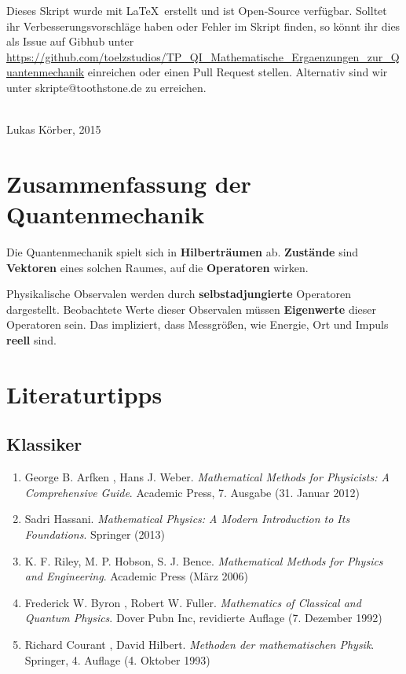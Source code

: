 \documentclass[a4paper,12pt,portrait]{book}
\numberwithin{equation}{section}
\begin{document}
Dieses Skript wurde mit \LaTeX \ erstellt und ist Open-Source verfügbar. Solltet ihr Verbesserungsvorschläge haben oder Fehler im Skript finden, so könnt ihr dies als Issue auf Gibhub unter   \url{https://github.com/toelzstudios/TP_QI_Mathematische_Ergaenzungen_zur_Quantenmechanik} einreichen oder einen Pull Request stellen. Alternativ sind wir unter skripte@toothstone.de zu erreichen.

\ \\
Lukas Körber, 2015
\endgroup






\tableofcontents

\newpage
\section{Zusammenfassung der Quantenmechanik}

Die Quantenmechanik spielt sich in \textbf{Hilberträumen} ab. \textbf{Zustände} sind \textbf{Vektoren} eines solchen Raumes, auf die \textbf{Operatoren} wirken.

Physikalische Observalen werden durch \textbf{selbstadjungierte} Operatoren dargestellt. Beobachtete Werte dieser Observalen müssen \textbf{Eigenwerte} dieser Operatoren sein. Das impliziert, dass Messgrößen, wie Energie, Ort und Impuls \textbf{reell} sind.

\section{Literaturtipps}
\subsection{Klassiker}
\begin{enumerate}
	\item George B. Arfken ,  Hans J. Weber. \textit{Mathematical Methods for Physicists: A Comprehensive Guide}.  Academic Press, 7. Ausgabe (31. Januar 2012) 
	\item Sadri Hassani. \textit{Mathematical Physics: A Modern Introduction to Its Foundations}. Springer (2013) 
	\item K. F. Riley, M. P. Hobson, S. J. Bence. \textit{Mathematical Methods for Physics and Engineering}. Academic Press (März 2006)
	\item Frederick W. Byron , Robert W. Fuller. \textit{Mathematics of Classical and Quantum Physics}. Dover Pubn Inc, revidierte Auflage (7. Dezember 1992)
	\item Richard Courant , David Hilbert. \textit{Methoden der mathematischen Physik}. Springer, 4. Auflage (4. Oktober 1993)
\end{enumerate}
\end{document}
